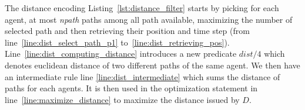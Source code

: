 The distance encoding Listing~\ref{lst:distance_filter} starts by picking for each agent, at most \textit{npath} paths among all path available, maximizing the number of selected path and then retrieving their position and time step (from line~\ref{line:dist_select_path_p1} to~\ref{line:dist_retrieving_pos}). Line~\ref{line:dist_computing_distance} introduces a new predicate \(dist/4\) which denotes  euclidean distance of two different paths of the same agent. We then have an intermediate rule line \ref{line:dist_intermediate} which sums the distance of paths for each agents. It is then used in the optimization statement in line~\ref{line:maximize_distance} to maximize the distance issued by \(D\).